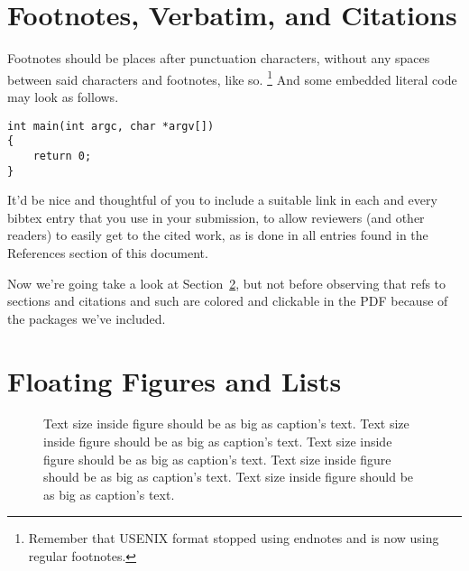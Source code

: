 \section{Footnotes, Verbatim, and Citations}

Footnotes should be places after punctuation characters, without any
spaces between said characters and footnotes, like so.%
\footnote{Remember that USENIX format stopped using endnotes and is
	now using regular footnotes.} And some embedded literal code may
look as follows.

\begin{verbatim}
int main(int argc, char *argv[]) 
{
    return 0;
}
\end{verbatim}

It'd be nice and thoughtful of you to include a suitable link in each
and every bibtex entry that you use in your submission, to allow
reviewers (and other readers) to easily get to the cited work, as is
done in all entries found in the References section of this document.

Now we're going take a look at Section~\ref{sec:figs}, but not before
observing that refs to sections and citations and such are colored and
clickable in the PDF because of the packages we've included.

\section{Floating Figures and Lists}
\label{sec:figs}


\begin{figure}
	\begin{center}
	\end{center}
	\caption{\label{fig:vectors} Text size inside figure should be as big as
		caption's text. Text size inside figure should be as big as
		caption's text. Text size inside figure should be as big as
		caption's text. Text size inside figure should be as big as
		caption's text. Text size inside figure should be as big as
		caption's text. }
\end{figure}


